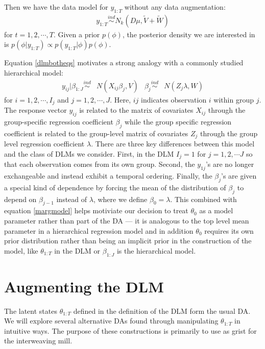 \documentclass{article}
\begin{document}
Then we have the data model for $y_{1:T}$ without any data augmentation:
\begin{align}
  y_{1:T} \stackrel{ind}{\sim} N_{k}(D\mu, \tilde{V} + \tilde{W}) \label{margmodel}
\end{align}
for $t=1,2,\cdots,T$. Given a prior $p(\phi)$, the posterior density we are interested in is $p(\phi|y_{1:T})\propto p(y_{1:T}|\phi)p(\phi)$.

Equation \eqref{dlmbotheqs} motivates a strong analogy with a commonly studied hierarchical model:
\begin{align*}
  y_{ij}|\beta_{1:J} \stackrel{ind}{\sim} & N(X_{ij}\beta_j,V) &
  \beta_j \stackrel{ind}{\sim} & N(Z_j\lambda,W)
\end{align*}
for $i=1,2,\cdots,I_j$ and $j=1,2,\cdots,J$. Here, $ij$ indicates observation $i$ within group $j$. The response vector $y_{ij}$ is related to the matrix of covariates $X_{ij}$ through the group-specific regression coefficient $\beta_j$ while the group specific regression coefficient is related to the group-level matrix of covariates $Z_j$ through the group level regression coefficient $\lambda$. There are three key differences between this model and the class of DLMs we consider. First, in the DLM $I_j=1$ for $j=1,2,\cdots J$ so that each observation comes from its own group. Second, the $y_{1j}$'s are no longer exchangeable and instead exhibit a temporal ordering. Finally, the $\beta_j$'s are given a special kind of dependence by forcing the mean of the distribution of $\beta_j$ to depend on $\beta_{j-1}$ instead of $\lambda$, where we define $\beta_0=\lambda$. This combined with equation \eqref{margmodel} helps motiviate our decision to treat $\theta_0$ as a model parameter rather than part of the DA --- it is analogous to the top level mean parameter in a hierarchical regression model and in addition $\theta_0$ requires its own prior distribution rather than being an implicit prior in the construction of the model, like $\theta_{1:T}$ in the DLM or $\beta_{1:J}$ is the hierarchical model.

\section{Augmenting the DLM}\label{sec:DAs}
The latent states $\theta_{1:T}$ defined in the definition of the DLM form the usual DA. We will explore several alternative DAs found through manipulating $\theta_{1:T}$ in intuitive ways. The purpose of these constructions is primarily to use as grist for the interweaving mill.
\end{document}
